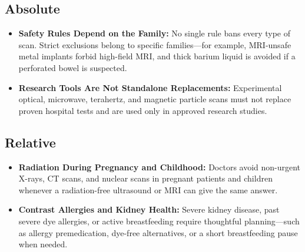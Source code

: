 \subsection{Absolute}
\begin{itemize}
  \item \textbf{Safety Rules Depend on the Family:} No single rule bans every type of scan. Strict exclusions belong to specific families---for example, MRI-unsafe metal implants forbid high-field MRI, and thick barium liquid is avoided if a perforated bowel is suspected.
  \item \textbf{Research Tools Are Not Standalone Replacements:} Experimental optical, microwave, terahertz, and magnetic particle scans must not replace proven hospital tests and are used only in approved research studies.
\end{itemize}

\subsection{Relative}
\begin{itemize}
  \item \textbf{Radiation During Pregnancy and Childhood:} Doctors avoid non-urgent X-rays, CT scans, and nuclear scans in pregnant patients and children whenever a radiation-free ultrasound or MRI can give the same answer.
  \item \textbf{Contrast Allergies and Kidney Health:} Severe kidney disease, past severe dye allergies, or active breastfeeding require thoughtful planning---such as allergy premedication, dye-free alternatives, or a short breastfeeding pause when needed.
\end{itemize}

